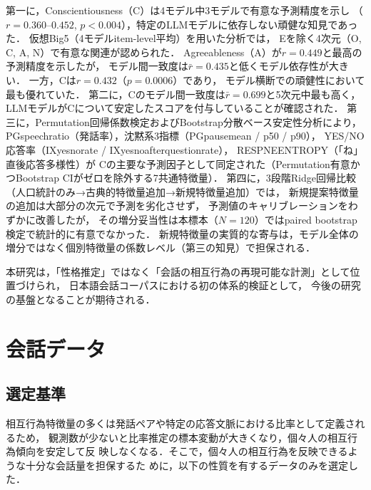 \documentclass[dvipdfmx,11pt,a4paper]{bxjsarticle}
\renewcommand{\_}{\paperorigunderscore\allowbreak}%
\begin{document}
第一に，Conscientiousness（C）は4モデル中3モデルで有意な予測精度を示し
（$r = 0.360$--$0.452$, $p < 0.004$），特定のLLMモデルに依存しない頑健な知見であった．
仮想Big5（4モデルitem-level平均）を用いた分析では，
Eを除く4次元（O, C, A, N）で有意な関連が認められた．
Agreeableness（A）が$r = 0.449$と最高の予測精度を示したが，
モデル間一致度は$\bar{r} = 0.435$と低くモデル依存性が大きい．
一方，Cは$r = 0.432$（$p = 0.0006$）であり，
モデル横断での頑健性において最も優れていた．
第二に，Cのモデル間一致度は$\bar{r} = 0.699$と5次元中最も高く，
LLMモデルがCについて安定したスコアを付与していることが確認された．
第三に，Permutation回帰係数検定およびBootstrap分散ベース安定性分析により，
PG\_speech\_ratio（発話率），沈黙系3指標（PG\_pause\_mean / p50 / p90），
YES/NO応答率（IX\_yesno\_rate / IX\_yesno\_after\_question\_rate），
RESP\_NE\_ENTROPY（「ね」直後応答多様性）が
Cの主要な予測因子として同定された（Permutation有意かつBootstrap CIがゼロを除外する7共通特徴量）．
第四に，3段階Ridge回帰比較（人口統計のみ→古典的特徴量追加→新規特徴量追加）では，
新規提案特徴量の追加は大部分の次元で予測を劣化させず，
予測値のキャリブレーションをわずかに改善したが，
その増分妥当性は本標本（$N = 120$）ではpaired bootstrap検定で統計的に有意でなかった．
新規特徴量の実質的な寄与は，モデル全体の増分ではなく個別特徴量の係数レベル（第三の知見）で担保される．

本研究は，「性格推定」ではなく「会話の相互行為の再現可能な計測」として位置づけられ，
日本語会話コーパスにおける初の体系的検証として，
今後の研究の基盤となることが期待される．


\clearpage


\appendix


\section{会話データ}
\label{sec:supp_dataset}


\subsection{選定基準}
相互行為特徴量の多くは発話ペアや特定の応答文脈における比率として定義されるため，
観測数が少ないと比率推定の標本変動が大きくなり，個々人の相互行為傾向を安定して反
映しなくなる．そこで，個々人の相互行為を反映できるような十分な会話量を担保するた
めに，以下の性質を有するデータのみを選定した．
\end{document}
